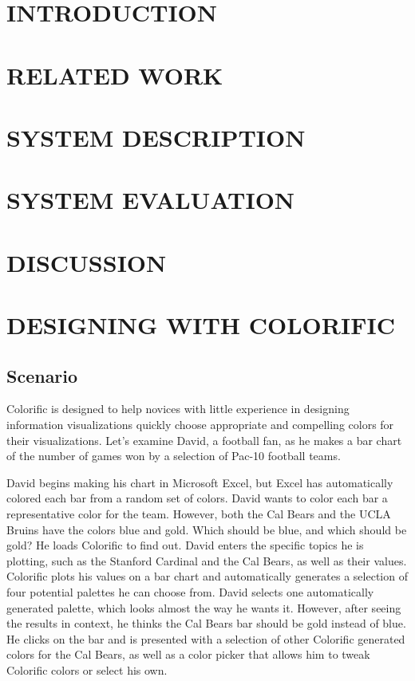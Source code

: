 \documentclass{article}
\newcommand{\system}{Colorific\xspace}
\begin{document}



\section{INTRODUCTION}


\section{RELATED WORK}

\section{SYSTEM DESCRIPTION}

\section{SYSTEM EVALUATION}

\section{DISCUSSION}

\section{DESIGNING WITH COLORIFIC}
\subsection{Scenario}
\system is designed to help novices with little experience in designing information visualizations quickly choose appropriate and compelling colors for their visualizations. Let's examine David, a football fan, as he makes a bar chart of the number of games won by a selection of Pac-10 football teams. 

David begins making his chart in Microsoft Excel, but Excel has automatically colored each bar from a random set of colors. David wants to color each bar a representative color for the team. However, both the Cal Bears and the UCLA Bruins have the colors blue and gold. Which should be blue, and which should be gold? He loads \system to find out. David enters the specific topics he is plotting, such as the Stanford Cardinal and the Cal Bears, as well as their values. \system plots his values on a bar chart and automatically generates a selection of four potential palettes he can choose from. David selects one automatically generated palette, which looks almost the way he wants it. However, after seeing the results in context, he thinks the Cal Bears bar should be gold instead of blue. He clicks on the bar and is presented with a selection of other \system generated colors for the Cal Bears, as well as a color picker that allows him to tweak \system colors or select his own. 
\end{document}
